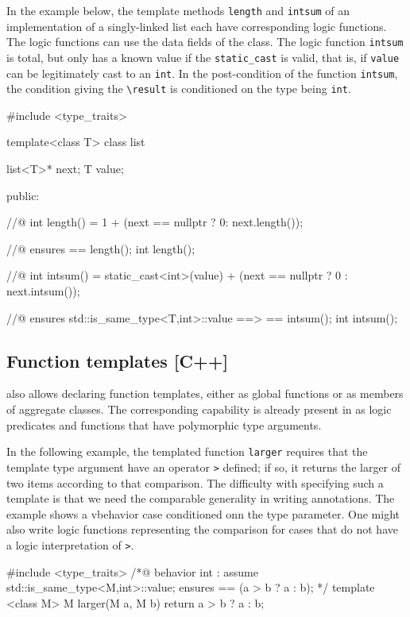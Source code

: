 In the example below, the template methods \lstinline|length| and \lstinline|intsum| of an implementation of a singly-linked list each have corresponding logic functions. The logic functions can use the data fields of the class. The logic function \lstinline|intsum| is total, but only has a known value if the \lstinline|static_cast| is valid, that is, if \lstinline|value| can be legitimately cast to an \lstinline|int|. In the post-condition of the \lang function \lstinline|intsum|, the condition giving the \lstinline|\result| is conditioned on the type being \lstinline|int|.
\begin{example}
\#include <type\_traits>

template<class T> class list {
  list<T>* next;
  T value;
  
public:

  //@ int length() = 1 + (next == nullptr ? 0: next.length());

  //@ ensures \result == length();
  int length();
  
  //@ int intsum() =  static\_cast<int>(value) + (next == nullptr ? 0 : next.intsum());
  
  //@ ensures std::is\_same\_type<T,int>::value ==> \result == intsum();
  int intsum();
  
}
\end{example} 

\subsection{Function templates [C++]}

\lang also allows declaring function templates, either as global functions or as members of aggregate classes. The corresponding capability is already present in \NAME as logic predicates and functions that have polymorphic type arguments.

In the following example, the templated function \lstinline|larger| requires that the template type argument have an operator \lstinline|>| defined; if so, it returns the larger of two items according to that comparison. The difficulty with specifying such a template is that we need the comparable generality in writing \NAME annotations. The example shows a vbehavior case conditioned onn the type parameter. One might also write logic functions representing the comparison for cases that do not have a logic interpretation of \lstinline|>|.

\begin{example}
\#include <type\_traits>
/*@ behavior int :
       assume std::is\_same\_type<M,int>::value;
       ensures \result == (a > b ? a : b);
 */
template <class M>
M larger(M a, M b) {
  return a > b ? a : b;
}
\end{example}



